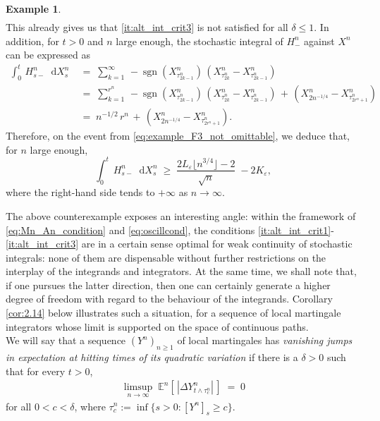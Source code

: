 \documentclass[11pt]{article}
\theoremstyle{definition}\newtheorem{example}[theorem]{Example}
\theoremstyle{definition}\newtheorem{counterexample}[theorem]{Counterexample}
\theoremstyle{definition}\newtheorem{remark}[theorem]{Remark}
\theoremstyle{definition}\newtheorem{defi}[theorem]{Definition}
\numberwithin{equation}{section}
\newcommand*\diff{\mathop{}\!\mathrm{d}}								%
\newcommand{\E}{\mathbb{E}}											%
\renewcommand{\|}{\; : \, \;}											%
\begin{document}
\begin{example}
\begin{align}
	\end{align}
	This already gives us that \eqref{it:alt_int_crit3} is not satisfied for all $\delta\le 1$. In addition, for $t>0$ and $n$ large enough, the stochastic integral of $H^n_-$ against $X^n$ can be expressed as
	\begin{align*} \int_0^t \, H^n_{s-} \diff X^n_s \; &= \; \sum_{k=1}^\infty \, - \operatorname{sgn}(X^n_{\tau^n_{2k-1}})\, (X^n_{\tau^n_{2k}}-X^n_{\tau^n_{2k-1}}) \\
		&= \; \sum_{k=1}^{r^n} \, - \operatorname{sgn}(X^n_{\tau^n_{2k-1}})\, (X^n_{\tau^n_{2k}}-X^n_{\tau^n_{2k-1}}) \, + \, (X^n_{2n^{-1/4}} - X^n_{\tau^n_{2r^n+1}}) \\
		&= \; n^{-1/2}\, r^n \, + \, (X^n_{2n^{-1/4}} - X^n_{\tau^n_{2r^n+1}}).
	\end{align*}
	Therefore, on the event from \eqref{eq:example_F3_not_omittable}, we deduce that, for $n$ large enough,
	$$ \int_0^t \, H^n_{s-} \diff X^n_s \; \ge \; \frac{2L_\varepsilon \lfloor n^{3/4} \rfloor -2}{\sqrt{n}} \; - 2 K_\varepsilon,$$
	where the right-hand side tends to $+\infty$ as $n\rightarrow\infty$.
\end{example}

The above counterexample exposes an interesting angle: within the framework of \eqref{eq:Mn_An_condition} and \eqref{eq:oscillcond}, the conditions \eqref{it:alt_int_crit1}-\eqref{it:alt_int_crit3} are in a certain sense optimal for weak continuity of stochastic integrals: none of them are dispensable without further restrictions on the interplay of the integrands and integrators. At the same time, we shall note that, if one pursues the latter direction, then one can certainly generate a higher degree of freedom with regard to the behaviour of the integrands. Corollary \ref{cor:2.14} below illustrates such a situation, for a sequence of local martingale integrators whose limit is supported on the space of continuous paths.\\


We will say that a sequence $(Y^n)_{n\ge 1}$ of local martingales has \emph{vanishing jumps in expectation at hitting times of its quadratic variation} if there is a $\delta>0$ such that for every $t>0$,
\begin{align} \limsup_{n\to \infty} \;  \E^n[ \, |\Delta Y^n_{t\wedge \tau^n_c}|\, ] \; = \; 0 \label{eq:vanishing_jumps_condition} \end{align}
for all $0<c<\delta$, where $\tau^n_c:= \operatorname{inf}\{ s>0: [Y^n]_s \ge  c\}$.
\end{document}
